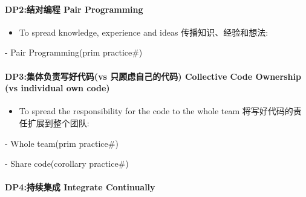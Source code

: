 \hypertarget{dp2ux7ed3ux5bf9ux7f16ux7a0b-pair-programming}{%
\paragraph{DP2:结对编程 Pair
Programming}\label{dp2ux7ed3ux5bf9ux7f16ux7a0b-pair-programming}}

\begin{itemize}
\tightlist
\item
  To spread knowledge, experience and ideas 传播知识、经验和想法:\\
\end{itemize}

\begin{description}
\tightlist
\item[]
- Pair Programming(prim practice\#)
\end{description}

\hypertarget{dp3ux96c6ux4f53ux8d1fux8d23ux5199ux597dux4ee3ux7801vs-ux53eaux987eux8651ux81eaux5df1ux7684ux4ee3ux7801-collective-code-ownership-vs-individual-own-code}{%
\paragraph{DP3:集体负责写好代码(vs 只顾虑自己的代码) Collective Code
Ownership (vs individual own
code)}\label{dp3ux96c6ux4f53ux8d1fux8d23ux5199ux597dux4ee3ux7801vs-ux53eaux987eux8651ux81eaux5df1ux7684ux4ee3ux7801-collective-code-ownership-vs-individual-own-code}}

\begin{itemize}
\tightlist
\item
  To spread the responsibility for the code to the whole team
  将写好代码的责任扩展到整个团队:\\
\end{itemize}

\begin{description}
\tightlist
\item[]
- Whole team(prim practice\#)

- Share code(corollary practice\#)
\end{description}

\hypertarget{dp4ux6301ux7eedux96c6ux6210-integrate-continually}{%
\paragraph{DP4:持续集成 Integrate
Continually}\label{dp4ux6301ux7eedux96c6ux6210-integrate-continually}}

